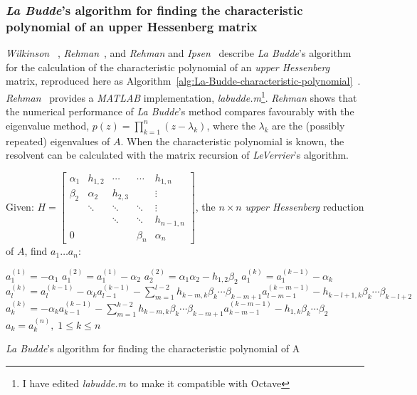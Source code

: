 \documentclass[a4paper,twoside,10pt,english]{report}
\begin{document}
\subsubsection{\emph{La Budde}'s algorithm for finding the 
characteristic polynomial of an upper Hessenberg matrix}
\emph{Wilkinson}~\cite[Section 57, Chapter 6]
{Wilkinson_AlgebraicEigenvalueProblem} ,
\emph{Rehman}~\cite[Chapter 6]{Rehman_ComputationCharacteristicPolynomial},
and \emph{Rehman} and \emph{Ipsen}~\cite{RehmanIpsen_BuddeCharacteristicPoly}
describe \emph{La Budde}'s algorithm for the calculation of the characteristic 
polynomial of an \emph{upper Hessenberg} matrix, reproduced here as 
Algorithm~\ref{alg:La-Budde-characteristic-polynomial}~\cite[Algorithm 2]
{RehmanIpsen_BuddeCharacteristicPoly}. 
\emph{Rehman}~\cite[Appendix B]{Rehman_ComputationCharacteristicPolynomial} 
provides a \emph{MATLAB} implementation, \emph{labudde.m}\footnote{I have edited
\emph{labudde.m} to make it compatible with Octave}. \emph{Rehman} shows that
the numerical performance of \emph{La Budde}'s method compares favourably with
the eigenvalue method, 
$p\left(z\right)=\prod_{k=1}^{n}\left(z-\lambda_{k}\right)$, where the 
$\lambda_{k}$ are the (possibly repeated) eigenvalues of $A$. When the
characteristic polynomial is known, the resolvent can be calculated with the
matrix recursion of \emph{LeVerrier}'s algorithm.

\begin{algorithm}[!htbp]
Given:
$H = \left[\begin{array}{ccccc}
\alpha_{1} & h_{1,2} & \cdots & \cdots & h_{1,n}\\
\beta_{2} & \alpha_{2} & h_{2,3} & & \vdots \\
 & \ddots & \ddots & \ddots & \vdots \\
 & & \ddots & \ddots & h_{n-1,n} \\
0 & & & \beta_{n} & \alpha_{n}
\end{array}\right]$, the $n\times{}n$ \emph{upper Hessenberg} reduction of $A$,
find $a_{1}\hdots{}a_{n}$:
\begin{algorithmic}
\State $a_{1}^{\left(1\right)}=-\alpha_{1}$
\State $a_{1}^{\left(2\right)}=a_{1}^{\left(1\right)}-\alpha_{2}$
\State $a_{2}^{\left(2\right)}=\alpha_{1}\alpha_{2}-h_{1,2}\beta_{2}$
\State $a_{1}^{\left(k\right)}=a_{1}^{\left(k-1\right)}-\alpha_{k}$
\State $a_{l}^{\left(k\right)}=a_{l}^{\left(k-1\right)}
-\alpha_{k}a_{l-1}^{\left(k-1\right)}
-\sum_{m=1}^{l-2}h_{k-m,k}\beta_{k}\cdots\beta_{k-m+1}a_{l-m-1}^{\left(k-m-1\right)}
-h_{k-l+1,k}\beta_{k}\cdots\beta_{k-l+2}$
\EndFor
\State $a_{k}^{\left(k\right)}=-\alpha_{k}a_{k-1}^{\left(k-1\right)}
-\sum_{m=1}^{k-2}h_{k-m,k}\beta_{k}\cdots\beta_{k-m+1}a_{k-m-1}^{\left(k-m-1\right)}
-h_{1,k}\beta_{k}\cdots\beta_{2}$
\EndFor\
\State $a_{k}=a_{k}^{\left(n\right)} ,\;1\le{}k\le{}n$
\end{algorithmic}
\caption{\emph{La Budde}'s algorithm for finding the characteristic polynomial of A~\cite[Algorithm 2]{RehmanIpsen_BuddeCharacteristicPoly}}
\label{alg:La-Budde-characteristic-polynomial}
\end{algorithm}
\end{document}
